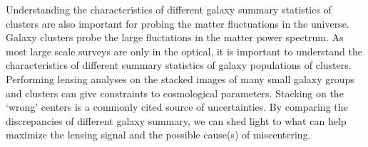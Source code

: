 Understanding the characteristics of different galaxy
summary statistics of clusters are also important for  
probing the matter fluctuations in the universe. 
Galaxy clusters probe the large fluctations in the matter power spectrum.
As most large scale surveys are only in the optical, it is important to
understand the characteristics of different summary statistics of galaxy
populations of clusters.
Performing lensing analyses on the stacked images of 
many small galaxy groups and clusters can give constraints to cosmological
parameters. Stacking on the `wrong' centers is a commonly cited
source of uncertainties. By comparing the discrepancies of different galaxy
summary, we can shed light to what can help maximize the lensing signal and 
the possible cause(s) of miscentering. 

% 
% 

